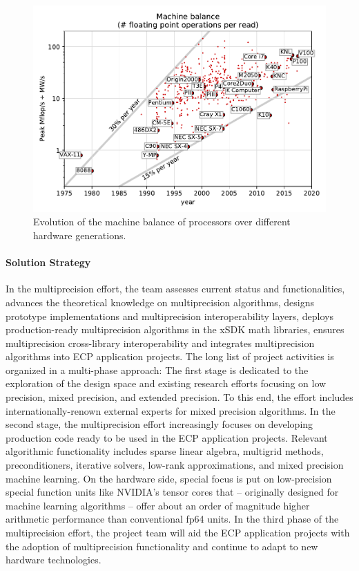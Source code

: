 \begin{figure}[htb]
	\centering
	\includegraphics[width=.8\columnwidth]{projects/2.3.3-MathLibs/2.3.3.01-xSDK/xSDK-machinebalance.pdf}
	\caption{\label{fig:xsdk-machinebalance} Evolution of the machine balance of processors over different hardware generations.}
\end{figure}


\paragraph{Solution Strategy}
In the multiprecision effort, the team assesses current status and functionalities, advances the theoretical knowledge on multiprecision algorithms, designs prototype implementations and multiprecision interoperability layers, deploys production-ready multiprecision algorithms in the xSDK math libraries, ensures multiprecision cross-library interoperability and integrates multiprecision algorithms into ECP application projects. The long list of project activities is organized in a multi-phase approach:
The first stage is dedicated to the exploration of the design space and existing research efforts focusing on low precision, mixed precision, and extended precision. To this end, the effort  includes internationally-renown external experts for mixed precision algorithms. In the second stage, the multiprecision effort increasingly focuses on developing production code ready to be used in the ECP application projects. Relevant algorithmic functionality includes sparse linear algebra, multigrid methods, preconditioners, iterative solvers, low-rank approximations, and mixed precision machine learning.
On the hardware side, special focus is put on low-precision special function units like NVIDIA’s tensor cores that -- originally designed for machine learning algorithms -- offer about an order of magnitude higher arithmetic performance than conventional fp64 units. 
In the third phase of the multiprecision effort, the project team will aid the ECP application projects with the adoption of multiprecision functionality and continue to adapt to new hardware technologies.


